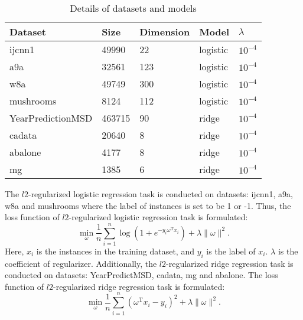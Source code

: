 \documentclass[conference]{IEEEtran}
\begin{document}
 
 \begin{table}
\centering
\caption{Details of datasets and models}
\label{data_information}
\begin{tabular}{|l|l|l|l|l|}
\hline
Dataset           & Size & Dimension & Model & $\lambda$ \\ \hline
ijcnn1            &  49990 &  22 &   logistic    &  $10^{-4}$         \\
a9a               &   32561&123   &     logistic  &      $10^{-4}$     \\ 
w8a               &  49749 & 300   &  logistic &  $10^{-4}$     \\ 
mushrooms   &   8124     &112    & logistic   &  $10^{-4}$     \\ 
YearPredictionMSD & 463715  &  90 &    ridge  &      $10^{-4}$     \\
cadata              & 20640  &8   &     ridge  &    $10^{-4}$       \\ 
abalone          & 4177  & 8 &   ridge&   $10^{-4}$       \\ 
mg             &1385 &6 & ridge&  $10^{-4}$     \\ \hline
\end{tabular}
\end{table}
 

 The $l2$-regularized logistic regression task is conducted on datasets: ijcnn1, a9a, w8a and mushrooms where the label of instances  is set to be 1 or -1. Thus, the loss function of $l2$-regularized logistic regression task is formulated:
\begin{equation}
\label{logistic_reg}
\min\limits_\omega \frac{1}{n}\sum\limits_{i=1}^n \log(1+e^{-y_i \omega^\mathrm{T} x_i }) + \lambda \parallel \omega \parallel^2.
\end{equation} Here, $x_i$ is the instances in the training dataset, and $y_i$ is the label of $x_i$. $\lambda$ is the coefficient of regularizer. Additionally, the $l2$-regularized ridge regression task is conducted on  datasets: YearPredictMSD, cadata, mg and abalone. The loss function of $l2$-regularized ridge regression task is formulated:
\begin{equation}
\label{ridge_reg}
\min\limits_\omega \frac{1}{n}\sum\limits_{i=1}^n\left(\omega^{\mathrm{T}}x_i-y_i\right)^2 + \lambda \parallel \omega \parallel^2.
\end{equation}
\end{document}
